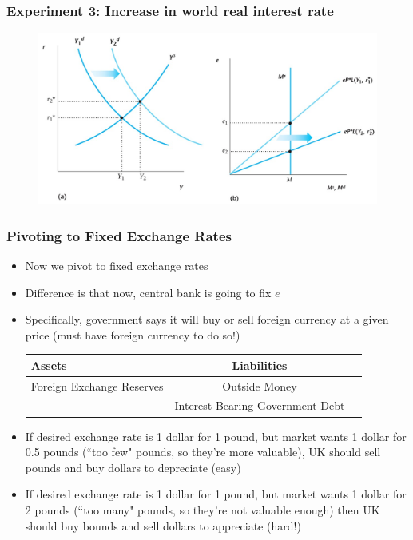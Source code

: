 \documentclass{beamer}
\begin{document}
\begin{frame}
\frametitle[alignment=center]{Experiment 3: Increase in world real interest rate}
\begin{figure}
\centering
\includegraphics[scale=0.54]{Figures/W_Fig_17pt6.png}
\end{figure}
\end{frame}


\begin{frame}
\frametitle[alignment=center]{Pivoting to Fixed Exchange Rates}
\begin{itemize}
\item Now we pivot to fixed exchange rates
\bigskip
\item Difference is that now, central bank is going to fix $e$
\bigskip
\item Specifically, government says it will buy or sell foreign currency at a given price (must have foreign currency to do so!)
\begin{table}[ht!]
\centering
\begin{tabular}{lcc}
Assets & Liabilities \\
\hline
Foreign Exchange Reserves & Outside Money \\
 & Interest-Bearing Government Debt\\
 \hline
\end{tabular}
\end{table}
\item If desired exchange rate is 1 dollar for 1 pound, but market wants 1 dollar for 0.5 pounds (``too few" pounds, so they're more valuable), UK should sell pounds and buy dollars to depreciate (easy)
\item If desired exchange rate is 1 dollar for 1 pound, but market wants 1 dollar for 2 pounds (``too many" pounds, so they're not valuable enough) then UK should buy bounds and sell dollars to appreciate (hard!)
\end{itemize}
\end{frame}
\end{document}
